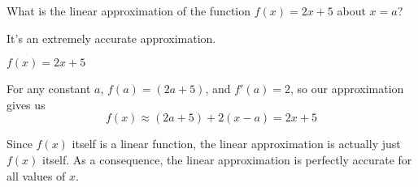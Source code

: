 \begin{question}
What is the linear approximation of the function $f(x)=2x+5$ about $x=a$?
\end{question}
\begin{hint}
It's an extremely accurate approximation.
\end{hint}
\begin{answer}
$f(x)=2x+5$
\end{answer}
\begin{solution}
For any constant $a$, $f(a)=(2a+5)$, and $f'(a)=2$, so our approximation gives us
\[f(x) \approx (2a+5)+2(x-a)=2x+5\]

Since $f(x)$ itself is a linear function, the linear approximation is actually just $f(x)$ itself. As a consequence, the linear approximation is perfectly accurate for all values of $x$.
\end{solution}



\subsection*{\Procedural}



